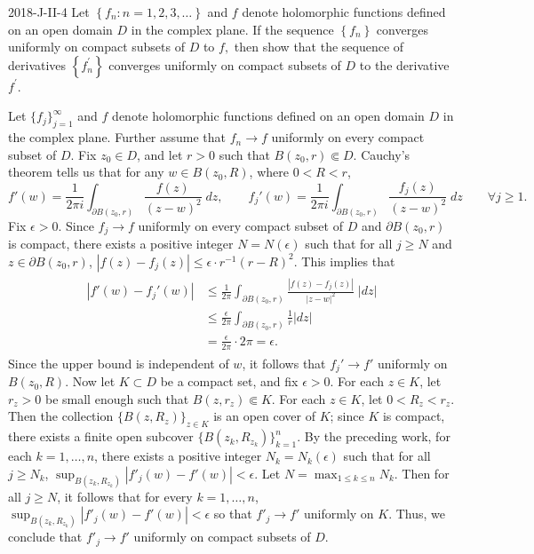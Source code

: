 \documentclass{article}
\begin{document}
	\begin{prb}{2018-J-II-4}
		Let $\left\{f_n: n=1,2,3, \ldots\right\}$ and $f$ denote holomorphic functions defined on an open domain $D$ in the complex plane. If the sequence $\left\{f_n\right\}$ converges uniformly on compact subsets of $D$ to $f,$ then show that the sequence of derivatives $\left\{f_n^{\prime}\right\}$ converges uniformly on compact subsets of $D$ to the derivative $f^{\prime}.$
	\end{prb}
	Let $\{f_{j}\}_{j = 1}^{\infty}$ and $f$ denote holomorphic functions defined on an open domain $D$ in the complex plane. Further assume that $f_{n} \to f$ uniformly on every compact subset of $D$. Fix $z_{0} \in D$, and let $r > 0$ such that $B(z_{0}, r) \Subset D$. Cauchy's theorem tells us that for any $w \in B(z_{0}, R)$, where $0 < R < r$, 
	\begin{equation*}
		f'(w) = \frac{1}{2\pi i}\int_{\partial B(z_{0}, r)}\frac{f(z)}{(z - w)^{2}}\;dz , \qquad f_{j}'(w) = \frac{1}{2\pi i }\int_{\partial B(z_{0}, r)}\frac{f_{j}(z)}{(z - w)^{2}}\;dz \qquad \forall j \geq 1. 
	\end{equation*}
	Fix $\epsilon > 0$. Since $f_{j} \to f$ uniformly on every compact subset of $D$ and $\partial B(z_{0}, r)$ is compact, there exists a positive integer $N = N(\epsilon)$ such that for all $j \geq N$ and $z \in \partial B(z_{0}, r)$, $|f(z) - f_{j}(z)| \leq \epsilon \cdot r^{-1}(r - R)^{2}$. This implies that 
	\begin{align*}
		\begin{split}
			|f'(w) - f_{j}'(w)| &\leq \frac{1}{2\pi}\int_{\partial B(z_{0}, r)}\frac{|f(z) - f_{j}(z)|}{|z - w|^{2}}\;|dz| \\
			&\leq \frac{\epsilon}{2\pi} \int_{\partial B(z_{0}, r)}\frac{1}{r}|dz| \\
			&= \frac{\epsilon}{2\pi} \cdot 2\pi = \epsilon. 
		\end{split}
	\end{align*}
	Since the upper bound is independent of $w$, it follows that $f_{j}'\to f'$ uniformly on $B(z_{0}, R)$. Now let $K \subset D$ be a compact set, and fix $\epsilon > 0$. For each $z \in K$, let $r_{z} > 0$ be small enough such that $B(z, r_{z}) \Subset K$. For each $z \in K$, let $0 < R_{z} < r_{z}$. Then the collection $\{B(z, R_{z})\}_{z \in K}$ is an open cover of $K$; since $K$ is compact, there exists a finite open subcover $\{B(z_{k}, R_{z_{k}})\}_{k = 1}^{n}$. By the preceding work, for each $k = 1, \ldots, n$, there exists a positive integer $N_{k} = N_{k}(\epsilon)$ such that for all $j \geq N_{k}$, $\sup_{B(z_{k}, R_{z_{k}})}|f'_{j}(w) - f'(w)| < \epsilon$. Let $N = \max_{1 \leq k \leq n}N_{k}$. Then for all $j \geq N$, it follows that for every $k = 1, \ldots, n$, $\sup_{B(z_{k}, R_{z_{k}})}|f'_{j}(w) - f'(w)| < \epsilon$ so that $f'_{j} \to f'$ uniformly on $K$. Thus, we conclude that $f'_{j}\to f'$ uniformly on compact subsets of $D$. 
	
\end{document}
